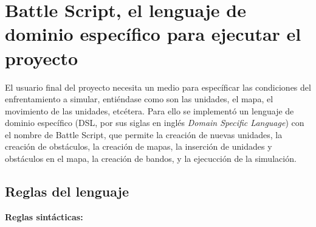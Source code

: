 \section{Battle Script, el lenguaje de dominio específico para ejecutar el proyecto}

El usuario final del proyecto necesita un medio para específicar las condiciones del enfrentamiento a simular, entiéndase como son las unidades, el mapa, el movimiento de las unidades, etcétera. Para ello se implementó un lenguaje de dominio específico (DSL, por sus siglas en inglés \textit{Domain Specific Language}) con el nombre de Battle Script, que permite la creación de nuevas unidades, la creación de obstáculos, la creación de mapas, la inserción de unidades y obstáculos en el mapa, la creación de bandos, y la ejecucción de la simulación.

\subsection{Reglas del lenguaje}

\textbf{Reglas sint\'acticas:}

